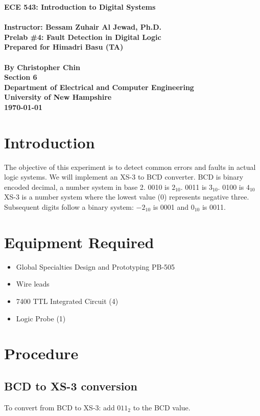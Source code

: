 \documentclass[11pt,a4paper]{article}
\begin{document}
\begin{center}
\textbf{
    \Large{ECE 543: Introduction to Digital Systems}
    \\~\\
    \large{Instructor: Bessam Zuhair Al Jewad, Ph.D.}
    \\[1.25in]
    \LARGE{Prelab \#4: Fault Detection in Digital Logic}
    \\[0.62in]
    \large{Prepared for Himadri Basu (TA)\\~\\By Christopher Chin}
    \\[1.25in]
    \LARGE{Section 6}
    \\[1.25in]
    \Large{Department of Electrical and Computer Engineering\\
           University of New Hampshire}
    \\[1.25in]
    \Large{\today}
}
\end{center}
\clearpage
{}

\tableofcontents
\pagebreak

\section{Introduction}
The objective of this experiment is to detect common errors and faults in actual logic systems.
We will implement an XS-3 to BCD converter.
BCD is binary encoded decimal, a number system in base 2.
0010 is $2_{10}$. 0011 is $3_{10}$. 0100 is $4_{10}$
XS-3 is a number system where the lowest value (0) represents negative three.
Subsequent digits follow a binary system: $-2_{10}$ is 0001 and $0_{10}$ is 0011.

\section{Equipment Required}
\begin{itemize}
    \item Global Specialties Design and Prototyping PB-505
    \item Wire leads
    \item 7400 TTL Integrated Circuit (4)
    \item Logic Probe (1)
\end{itemize}
\section{Procedure}
\subsection{BCD to XS-3 conversion}
To convert from BCD to XS-3: add $011_2$ to the BCD value.
\end{document}

